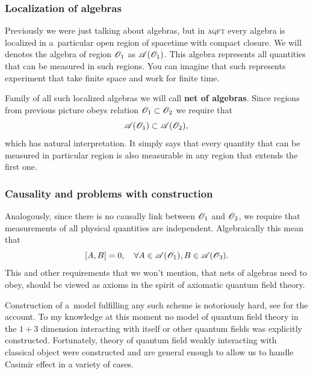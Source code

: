 \documentclass[10pt,t]{beamer}
\begin{document}
\begin{frame}
  \frametitle{Localization of algebras}


  Previously we were just talking about algebras, but in \textsc{aqft}
  every algebra is localized in a~particular open region of spacetime
  with compact closure. We will denotes the algebra of region $\mathcal{O}_{ 1 }$
  as $\mathcal{A}( \mathcal{O}_{ 1 } )$. This algebra represents all quantities
  that can be measured in such regions. You can imagine that such
  represents experiment that take finite space and work for finite time.

  Family of all such localized algebras we will call \textbf{net of
    algebras}. Since regions from previous picture obeys relation
  $\mathcal{O}_{ 1 } \subset \mathcal{O}_{ 2 }$ we require that
  \begin{equation}
    \label{eq:Overview-of-Herdegens-approach-ETC-05}
    \mathcal{A}( \mathcal{O}_{ 1 } ) \subset \mathcal{A}( \mathcal{O}_{ 2 } ),
  \end{equation}
  which has natural interpretation. It simply says that every quantity
  that can be measured in particular region is also measurable in any
  region that extends the first one.

\end{frame}





\begin{frame}
  \frametitle{Causality and problems with construction}


  Analogously, since there is no causally link between $\mathcal{O}_{ 1 }$ and
  $\mathcal{O}_{ 3 }$, we require that measurements of all physical quantities
  are independent. Algebraically this mean that
  \begin{equation}
    \label{eq:Overview-of-Herdegens-approach-ETC-06}
    [ A, B ] = 0, \quad
    \forall A \in \mathcal{A}( \mathcal{O}_{ 1 } ), B \in \mathcal{A}( \mathcal{O}_{ 3 } ).
  \end{equation}
  This and other requirements that we won't mention, that nets of algebras
  need to obey, should be viewed as axioms in the spirit of axiomatic
  quantum field theory.

  Construction of a~model fulfilling any such scheme is notoriously hard,
  see \parencite{Summers-Prespective-on-Constructive-ETC-Ver-2016} for the
  account. To my knowledge at this moment no
  model of quantum field theory in the $1 + 3$ dimension interacting with
  itself or other quantum fields was explicitly constructed. Fortunately,
  theory of quantum field weakly interacting with classical object
  were constructed and are general enough to allow us to handle Casimir
  effect in a variety of cases.

\end{frame}
\end{document}

